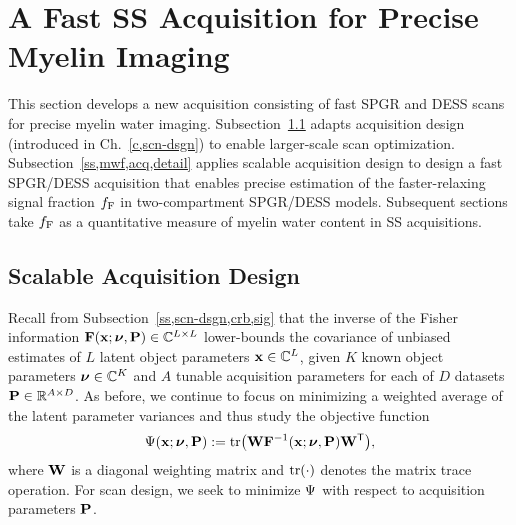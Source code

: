 \section{A Fast SS Acquisition for Precise Myelin Imaging}
\label{s,mwf,acq}

This section develops a new acquisition
consisting of fast SPGR and DESS scans
for precise myelin water imaging.
Subsection~\ref{ss,mwf,acq,design} 
adapts acquisition design
(introduced in Ch.~\ref{c,scn-dsgn})
to enable larger-scale scan optimization.
Subsection~\ref{ss,mwf,acq,detail}
applies scalable acquisition design
to design a fast SPGR/DESS acquisition
that enables precise estimation
of the faster-relaxing signal fraction $f_{\mathrm{F}}$ 
in two-compartment SPGR/DESS models.
Subsequent sections take $f_{\mathrm{F}}$ 
as a quantitative measure 
of myelin water content 
in SS acquisitions.

\subsection{Scalable Acquisition Design}
\label{ss,mwf,acq,design}

Recall from Subsection~\ref{ss,scn-dsgn,crb,sig} 
that the inverse 
of the Fisher information 
$\Fisher{\bmx;\bmnu,\bmP} \in \complexes{L \times L}$ 
lower-bounds the covariance
of unbiased estimates 
of $L$ latent object parameters $\mathbf{x} \in \mathbb{C}^{L}$,
given $K$ known object parameters $\boldsymbol{\nu} \in \mathbb{C}^{K}$ 
and $A$ tunable acquisition parameters 
for each of $D$ datasets 
$\mathbf{P} \in \mathbb{R}^{A \times D}$.
As before, we continue to focus 
on minimizing a weighted average 
of the latent parameter variances
and thus study the objective function
\begin{align}
	\costa{\bmx; \bmnu, \bmP} := 
		\trace{\bmW \bmF^{-1}\paren{\bmx;\bmnu,\bmP} \bmW\tpose},
	\label{eq:mwf,cost}
\end{align}
where $\mathbf{W}$ is a diagonal weighting matrix
and $\trace{\cdot}$ denotes the matrix trace operation.
For scan design,
we seek to minimize $\Psi$
with respect to acquisition parameters $\mathbf{P}$.

